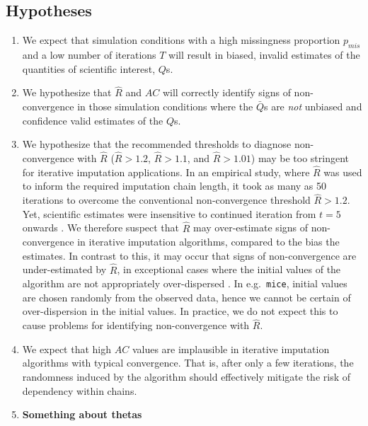 \documentclass[Royal,times,sageh]{sagej}
\begin{document}
\hypertarget{hypotheses}{%
\subsection{Hypotheses}\label{hypotheses}}

\begin{enumerate}
\def\labelenumi{\arabic{enumi}.}
\item
  We expect that simulation conditions with a high missingness proportion \(p_{mis}\) and a low number of iterations \(T\) will result in biased, invalid estimates of the quantities of scientific interest, \(Q\)s.
\item
  We hypothesize that \(\widehat{R}\) and \(AC\) will correctly identify signs of non-convergence in those simulation conditions where the \(\bar{Q}\)s are \emph{not} unbiased and confidence valid estimates of the \(Q\)s.
\item
  We hypothesize that the recommended thresholds to diagnose non-convergence with \(\widehat{R}\) (\(\widehat{R} > 1.2\), \(\widehat{R} > 1.1\), and \(\widehat{R} > 1.01\)) may be too stringent for iterative imputation applications. In an empirical study, where \(\widehat{R}\) was used to inform the required imputation chain length, it took as many as 50 iterations to overcome the conventional non-convergence threshold \(\widehat{R}>1.2\). Yet, scientific estimates were insensitive to continued iteration from \(t=5\) onwards \citep{lace07}. We therefore suspect that \(\widehat{R}\) may over-estimate signs of non-convergence in iterative imputation algorithms, compared to the bias the estimates. In contrast to this, it may occur that signs of non-convergence are under-estimated by \(\widehat{R}\), in exceptional cases where the initial values of the algorithm are not appropriately over-dispersed \citep[p.~437]{broo98}. In e.g.~\texttt{mice}, initial values are chosen randomly from the observed data, hence we cannot be certain of over-dispersion in the initial values. In practice, we do not expect this to cause problems for identifying non-convergence with \(\widehat{R}\).
\item
  We expect that high \(AC\) values are implausible in iterative imputation algorithms with typical convergence. That is, after only a few iterations, the randomness induced by the algorithm should effectively mitigate the risk of dependency within chains.
\item
  \textbf{Something about thetas}
\end{enumerate}
\end{document}

